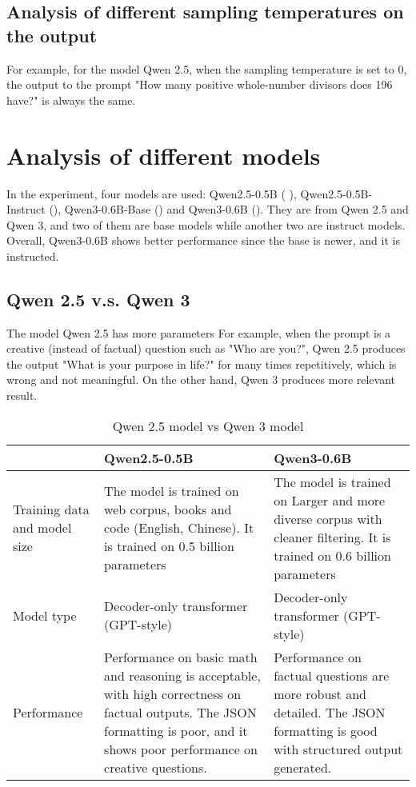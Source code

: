 \documentclass{article} %
\begin{document}
\subsection{Analysis of different sampling temperatures on the output}
For example, for the model Qwen 2.5, when the sampling temperature is set to 0, the output to the prompt "How many positive whole-number divisors does 196 have?" is always the same. 

\section{Analysis of different models}
In the experiment, four models are used: Qwen2.5-0.5B (
\cite{qwen2.5-0.5b}), Qwen2.5-0.5B-Instruct (\cite{qwen2.5-0.5b-instruct}), Qwen3-0.6B-Base (\cite{qwen3-0.6b-base}) and Qwen3-0.6B (\cite{qwen3-0.6b}). They are from Qwen 2.5 and Qwen 3, and two of them are base models while another two are instruct models. Overall, Qwen3-0.6B shows better performance since the base is newer, and it is instructed. 

\subsection{Qwen 2.5 v.s. Qwen 3}
The model Qwen 2.5 has more parameters 
For example, when the prompt is a creative (instead of factual) question such as "Who are you?", Qwen 2.5 produces the output "What is your purpose in life?" for many times repetitively, which is wrong and not meaningful. On the other hand, Qwen 3 produces more relevant result. 

\begin{table}[H]
  \centering
  \begin{tabular}{|p{3cm}|p{5cm}|p{5cm}|}
    \hline
    & Qwen2.5-0.5B& Qwen3-0.6B\\ \hline
    Training data and model size& The model is trained on web corpus, books and code (English, Chinese).
It is trained on 0.5 billion parameters& The model is trained on Larger and more diverse corpus with cleaner filtering. It is trained on 0.6 billion parameters\\ \hline
    Model type& 	Decoder-only transformer (GPT-style)& 	Decoder-only transformer (GPT-style)\\ \hline
    Performance& Performance on basic math and reasoning	is acceptable, with high correctness on factual outputs. The JSON formatting is poor, and it shows poor performance on creative questions.& Performance on factual questions are more robust and detailed. The JSON formatting is good with structured output generated. \\ \hline
  \end{tabular}
  \caption{Qwen 2.5 model vs Qwen 3 model}
  \label{tab:your_label}
\end{table}
\end{document}
